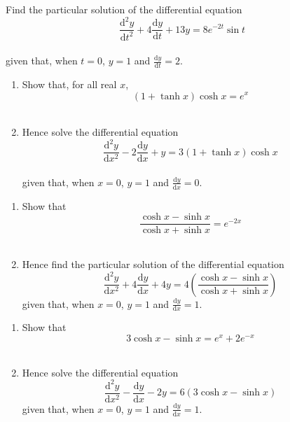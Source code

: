 \documentclass[leqno]{article}
\begin{document}
\begin{enumerate}[
  label=\textbf{\arabic*.},
  leftmargin=*,
  topsep=0pt,
  partopsep=0pt,
  parsep=0pt
]
Find the particular solution of the differential equation \\
\[
\frac{\mathrm{d}^2 y}{\mathrm{d}t^2}+4\frac{\mathrm{d}y}{\mathrm{d}t}+13y=8e^{-2t}\sin t
\] \\
given that, when $t=0$, $y=1$ and $\frac{\mathrm{d}y}{\mathrm{d}t}=2$. 

\newpage

\questionitem

\begin{enumerate}[label=\textbf{(\alph*)}]
  \item Show that, for all real $x$, \\
  \[
  (1+\tanh x)\cosh x = e^{x}
  \]
   \\
  \item Hence solve the differential equation \\
  \[
  \frac{\mathrm{d}^2 y}{\mathrm{d}x^2} - 2\frac{\mathrm{d}y}{\mathrm{d}x} + y = 3(1+\tanh x)\cosh x
  \]\\
  given that, when $x=0$, $y=1$ and $\frac{\mathrm{d}y}{\mathrm{d}x}=0$.  \\
\end{enumerate}

\newpage

\questionitem

\begin{enumerate}[label=\textbf{(\alph*)}]
  \item Show that \[\frac{\cosh x - \sinh x}{\cosh x + \sinh x}=e^{-2x}\]  \\
  \item Hence find the particular solution of the differential equation
  \[
  \frac{\mathrm{d}^2 y}{\mathrm{d}x^2} + 4\frac{\mathrm{d}y}{\mathrm{d}x} + 4y = 4\left(\frac{\cosh x - \sinh x}{\cosh x + \sinh x}\right)
  \]
  given that, when $x=0$, $y=1$ and $\frac{\mathrm{d}y}{\mathrm{d}x}=1$.  \\
\end{enumerate}

\newpage

\questionitem

\begin{enumerate}[label=\textbf{(\alph*)}]
  \item Show that \[3\cosh x - \sinh x = e^x + 2e^{-x}\]  \\
  \item Hence solve the differential equation
  \[
  \frac{\mathrm{d}^2 y}{\mathrm{d}x^2} - \frac{\mathrm{d}y}{\mathrm{d}x} - 2y = 6(3\cosh x - \sinh x)
  \]
  given that, when $x=0$, $y=1$ and $\frac{\mathrm{d}y}{\mathrm{d}x}=1$.  \\
\end{enumerate}


\end{enumerate}
\end{document}
